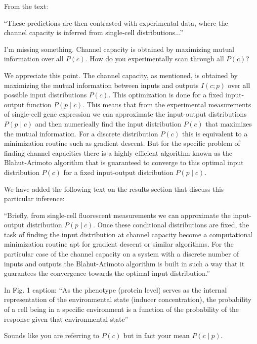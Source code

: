 \begin{tcolorbox}
  From the text:

``These predictions are then contrasted with experimental data, where the
channel capacity is inferred from single-cell distributions...''

I'm missing something. Channel capacity is obtained by maximizing mutual
information over all $P(c)$. How do you experimentally scan through all $P(c)$?
\end{tcolorbox}

We appreciate this point. The channel capacity, as mentioned, is obtained by
maximizing the mutual information between inputs and outputs $I(c; p)$ over all
possible input distributions $P(c)$. This optimization is done for a fixed
input-output function $P(p \mid c)$. This means that from the experimental
measurements of single-cell gene expression we can approximate the input-output
distributions $P(p \mid c)$ and then numerically find the input distribution
$P(c)$ that maximizes the mutual information. For a discrete distribution $P(c)$
this is equivalent to a minimization routine such as gradient descent. But for
the specific problem of finding channel capacities there is a highly efficient
algorithm known as the Blahut-Arimoto algorithm that is guaranteed to converge
to this optimal input distribution $P(c)$ for a fixed input-output distribution
$P(p \mid c)$.

We have added the following text on the results section that discuss this
particular inference:

``Briefly, from single-cell fluorescent measurements we can approximate the
input-output distribution $P(p \mid c)$. Once these conditional distributions
are fixed, the task of finding the input distribution at channel capacity become
a computational minimization routine apt for gradient descent or similar
algorithms. For the particular case of the channel capacity on a system with a
discrete number of inputs and outputs the Blahut-Arimoto algorithm is built in
such a way that it guarantees the convergence towards the optimal input
distribution.''

\begin{tcolorbox}
In Fig. 1 caption:
``As the phenotype (protein level) serves as the internal representation of the
environmental state (inducer concentration), the probability of a cell being in
a specific environment is a function of the probability of the response given
that environmental state''

Sounds like you are referring to $P(c)$ but in fact your mean $P(c \mid p)$.
\end{tcolorbox}

